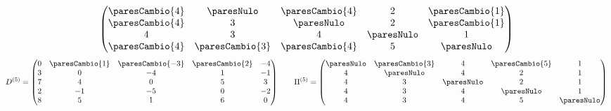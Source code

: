 \documentclass[11pt,letterpaper]{article}
\begin{document}
\begin{ejemplo}
{\[\begin{pmatrix}
    \paresCambio{4} & \paresNulo & \paresCambio{4} & 2 & \paresCambio{1} \\
    \paresCambio{4} & 3 & \paresNulo & 2 & \paresCambio{1} \\
    4 & 3 & 4 & \paresNulo & 1 \\
    \paresCambio{4} & \paresCambio{3} & \paresCambio{4} & 5 & \paresNulo
  \end{pmatrix}
  \]
  \[
  D^{(5)} = \begin{pmatrix}
    0 & \paresCambio{1} & \paresCambio{-3} & \paresCambio{2} & -4 \\
    3 & 0 & -4 & 1 & -1 \\
    7 & 4 & 0 & 5 & 3 \\
    2 & -1 & -5 & 0 & -2 \\
    8 & 5 & 1 & 6 & 0
  \end{pmatrix}
  \qquad
  \Pi^{(5)} = \begin{pmatrix}
    \paresNulo & \paresCambio{3} & 4 & \paresCambio{5} & 1 \\
    4 & \paresNulo & 4 & 2 & 1 \\
    4 & 3 & \paresNulo & 2 & 1 \\
    4 & 3 & 4 & \paresNulo & 1 \\
    4 & 3 & 4 & 5 & \paresNulo
  \end{pmatrix}
  \]
  }%
\end{ejemplo}
\end{document}
